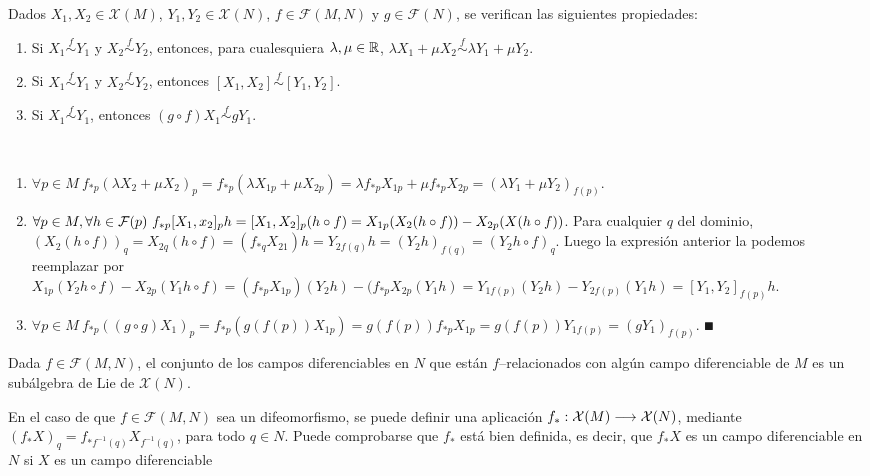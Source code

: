 \documentclass[Cursovd_portada.tex]{subfiles}
\begin{document}
\newpage

\begin{prop}
Dados $X_1,X_2\in\mathcal{X}(M)$, $Y_1,Y_2\in\mathcal{X}(N)$, $f\in\mathcal{F}(M,N)$ y $g\in\mathcal{F}(N)$, se
verifican las siguientes propiedades:
\begin{enumerate}
\item Si $X_1\stackrel{f}\sim Y_1$ y $X_2\stackrel{f}\sim Y_2$, entonces, para cualesquiera $\lambda,\mu\in\mathbb{R}$,
$\lambda X_1+\mu X_2\stackrel{f}\sim \lambda Y_1+\mu Y_2$.
\item Si $X_1\stackrel{f}\sim Y_1$ y $X_2\stackrel{f}\sim Y_2$, entonces $[X_1,X_2]\stackrel{f}\sim [Y_1,Y_2]$.
\item Si $X_1\stackrel{f}\sim Y_1$, entonces $(g\circ f)X_1\stackrel{f}\sim gY_1$.
\end{enumerate}
\end{prop}
\begin{dem}\
\begin{enumerate}
\item $\forall p\in M\ f_{*p}(\lambda X_2+\mu X_2)_p=f_{*p}(\lambda X_{1p}+\mu X_{2p})=\lambda f_{*p}X_{1p}+\mu f_{*p}X_{2p}=(\lambda Y_1 +\mu Y_2)_{f(p)}$.
\item $\forall p\in M,\forall h\in\calF(p)\ f_{*p}[X_1,x_2]_ph=[X_1,X_2]_p(h\circ f)=X_{1p}(X_2(h\circ f))-X_{2p}(X(h\circ f))$. Para cualquier $q$ del dominio, $(X_2(h\circ f))_q=X_{2q}(h\circ f)=(f_{*q}X_{21})h=Y_{2f(q)}h=(Y_2h)_{f(q)}=(Y_2h\circ f)_q$. Luego la expresión anterior la podemos reemplazar por $X_{1p}(Y_2h\circ f)-X_{2p}(Y_1h\circ f)=(f_{*p}X_{1p})(Y_2h)-(f_{*p}X_{2p}(Y_1h)=Y_{1f(p)}(Y_2h)-Y_{2f(p)}(Y_1h)=[Y_1,Y_2]_{f(p)}h.$
\item $\forall p\in M\ f_{*p}((g\circ g)X_1)_p=f_{*p}(g(f(p))X_{1p})=g(f(p))f_{*p}X_{1p}=g(f(p))Y_{1f(p)}=(gY_1)_{f(p)}$. $\QED$
\end{enumerate}
\end{dem}
\begin{coro}
Dada $f\in\mathcal{F}(M,N)$, el conjunto de los campos diferenciables en $N$ que están $f$--relacionados con algún
campo diferenciable de $M$ es un subálgebra de Lie de $\mathcal{X}(N)$.
\end{coro}
En el caso de que $f\in\mathcal{F}(M,N)$ sea un difeomorfismo, se
puede definir una aplicación
$f_*:\mathcal{X}(M)\longrightarrow\mathcal{X}(N)$, mediante
$(f_*X)_q=f_{*f^{-1}(q)}X_{f^{-1}(q)}$, para todo $q\in N$. Puede
comprobarse que $f_*$ está bien definida, es decir, que $f_*X$
es un campo diferenciable en $N$ si $X$ es un campo diferenciable
\end{document}
